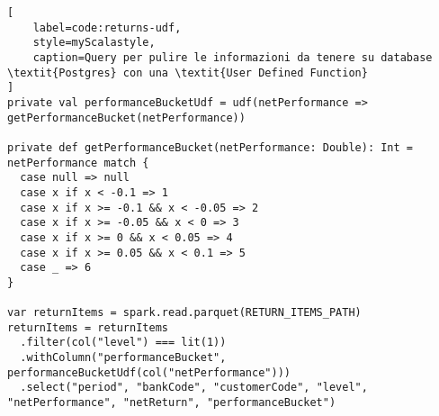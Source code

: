 \begin{lstlisting}[
    label=code:returns-udf,
    style=myScalastyle,
    caption=Query per pulire le informazioni da tenere su database \textit{Postgres} con una \textit{User Defined Function}
]
private val performanceBucketUdf = udf(netPerformance => getPerformanceBucket(netPerformance))

private def getPerformanceBucket(netPerformance: Double): Int = netPerformance match {
  case null => null
  case x if x < -0.1 => 1
  case x if x >= -0.1 && x < -0.05 => 2
  case x if x >= -0.05 && x < 0 => 3
  case x if x >= 0 && x < 0.05 => 4
  case x if x >= 0.05 && x < 0.1 => 5
  case _ => 6
}

var returnItems = spark.read.parquet(RETURN_ITEMS_PATH)
returnItems = returnItems
  .filter(col("level") === lit(1))
  .withColumn("performanceBucket", performanceBucketUdf(col("netPerformance")))
  .select("period", "bankCode", "customerCode", "level", "netPerformance", "netReturn", "performanceBucket")
\end{lstlisting}